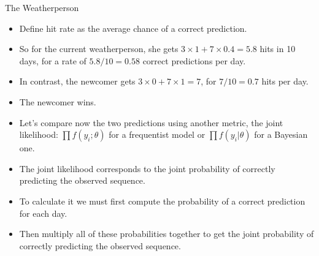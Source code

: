 \documentclass[handout]{beamer}
\begin{document}
\begin{frame}{The Weatherperson}
\scriptsize{

\begin{itemize}
\item Define hit rate as the average chance of a correct prediction. 
\item So for the current weatherperson, she gets $3 \times 1 + 7 \times 0.4 = 5.8$ hits in 10 days, for a rate of $5.8/10 = 0.58$ correct predictions per day.
\item In contrast, the newcomer gets $3 \times 0 + 7 \times 1 = 7$, for $7/10 = 0.7$ hits per day. 
\item The newcomer wins.

\item Let's compare now the two predictions using another metric, the joint likelihood: $\prod f(y_i;\theta)$ for a frequentist model or $\prod f(y_i|\theta)$ for a Bayesian one.

\item The joint likelihood corresponds to the joint probability of correctly predicting the observed sequence.


\item To calculate it we must first compute the probability of a correct prediction for each day.

\item Then multiply all of these probabilities together to get the joint probability of correctly predicting the observed sequence. 



\end{itemize}


} 
\end{frame}
\end{document}

